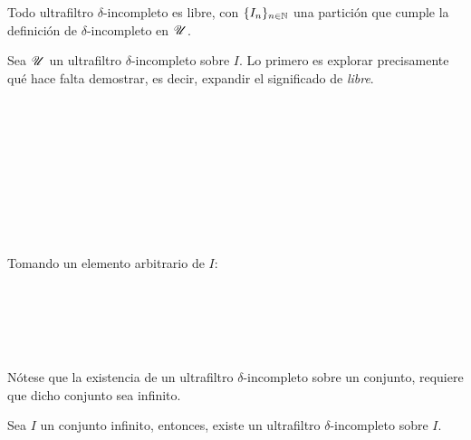 \begin{theorem}
  Todo ultrafiltro $\delta$-incompleto es libre, con
  $\{I_n\}_{n\in\mathbb{N}}$ una partición que cumple la definición de
  $\delta$-incompleto en $\mathscr{U}$.
\end{theorem}
\begin{demo}
  Sea $\mathscr{U}$ un ultrafiltro $\delta$-incompleto sobre $I$. Lo primero es
  explorar precisamente qué hace falta demostrar, es decir, expandir el
  significado de \emph{libre}.
  \begin{longderivation}
    \res{ \bigcap\U = \varnothing }\\
  \equiv\\
    \res{ \lnot \bigcap\U \not= \varnothing }\\
  \equiv\\
    \\
  \equiv\\
    \\
  \equiv\\
\end{longderivation}

Tomando un elemento arbitrario de $I$:
\begin{longderivation}
    \\
  \equiv\\
    \\
  \equiv\\
\end{longderivation}
\end{demo}

Nótese que la existencia de un ultrafiltro $\delta$-incompleto sobre
un conjunto, requiere que dicho conjunto sea infinito.

\begin{theorem}
  Sea $I$ un conjunto infinito, entonces, existe un ultrafiltro
  $\delta$-incompleto sobre $I$.
\end{theorem}

